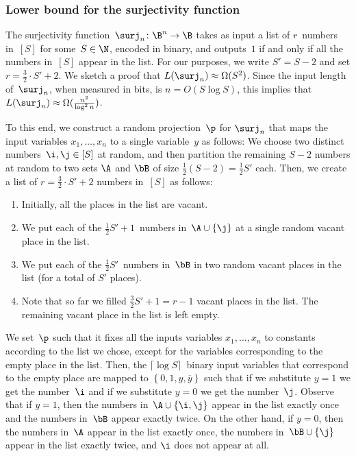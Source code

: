 \documentclass{toc}
\begin{document}
\subsubsection{Lower bound for the surjectivity function}

The surjectivity function~$\surj_{n}\colon\B^{n}\to\B$ \cite{BM12} takes
as input a list of $r$~numbers in~$\left[S\right]$ for some~$S\in\N$,
encoded in binary, and outputs~$1$ if and only if all the numbers
in~$\left[S\right]$ appear in the list. For our purposes, we 
%
write %
$S'=S-2$ and set $r=\frac{3}{2}\cdot S'+2$. We sketch a proof that
$L(\surj_{n})\approx\Omega(S^{2})$. Since the input length of~$\surj_{n}$,
%
when measured in bits, is $n=O(S\log S)$, this implies that $L(\surj_{n})\approx\Omega(\frac{n^{2}}{\log^{2}n})$.

To this end, we construct a random projection~$\p$ for $\surj_{n}$
that maps the input variables $x_{1},\ldots,x_{n}$ to a single variable~$y$
as follows: We choose two distinct numbers~$\i,\j\in\left[S\right]$ at random,
and then partition the remaining $S-2$ numbers at random to two sets
$\A$ and $\bB$ of size $\frac{1}{2}(S-2)=\frac{1}{2}S'$ each. Then,
we create a list of $r=\frac{3}{2}\cdot S'+2$ numbers in~$\left[S\right]$
as follows:
\begin{enumerate}
\item Initially, all the places in the list are vacant.

\item We put each of the $\frac{1}{2}S'+1$~numbers in~$\A\cup\left\{ \j\right\} $
at a single random vacant place in the list.
\item We put each of the $\frac{1}{2}S'$~numbers in~$\bB$ in two random vacant
places in the list (for a total of $S'$ places).
\item Note that so far we filled $\frac{3}{2}S'+1=r-1$ vacant places in the list.
The remaining vacant place in the list is left empty.
\end{enumerate}
We set~$\p$ such that it fixes all the inputs variables $x_{1},\ldots,x_{n}$
to constants according to the list we chose, except for the variables
corresponding to the empty place in the list. Then, the $\lceil \log S \rceil$~binary input variables
that correspond to the empty place are mapped to $\left\{ 0,1,y,\overline{y}\right\} $
such that if we substitute $y=1$ we get the number~$\i$ and if
we substitute $y=0$ we get the number~$\j$. Observe that if $y=1$,
then the numbers in~$\A\cup\left\{ \i,\j\right\} $ appear in the
list exactly once and the numbers in~$\bB$ appear exactly twice.
On the other hand, if $y=0$, then the numbers in~$\A$ appear in
the list exactly once, the numbers in~$\bB\cup\left\{ \j\right\} $
appear in the list exactly twice, and $\i$ does not appear at all.
\end{document}
